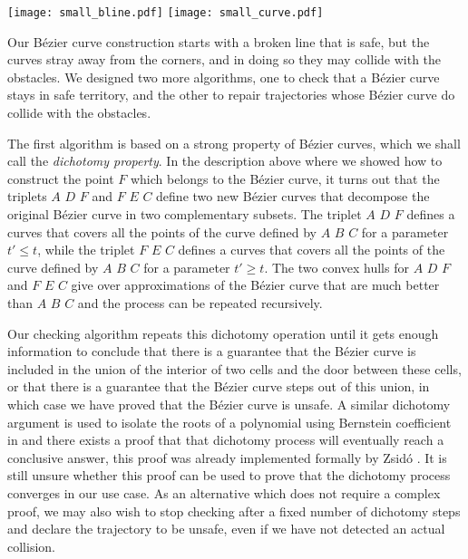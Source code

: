 \documentclass{llncs}
\begin{document}
\begin{center}
\texttt{[image: small\_bline.pdf]}
\texttt{[image: small\_curve.pdf]}
\end{center}

Our Bézier curve construction starts with a broken line that is safe,
but the curves stray away from the corners, and in doing so they may
collide with the obstacles.  We designed two more algorithms, one to check
that a Bézier curve stays in safe territory, and the other to repair
trajectories whose Bézier curve do collide with the obstacles.

The first algorithm is based on a strong property of Bézier curves,
which we shall call the {\em dichotomy property}.  In the description above
where we showed how to construct the point \(F\) which belongs to
the Bézier curve, it turns out that the triplets \(A\) \(D\) \(F\) and
\(F\) \(E\) \(C\) define two new Bézier curves that decompose the
original Bézier curve in two complementary subsets.  The triplet
\(A\) \(D\) \(F\) defines a curves that
covers all the points of the curve defined by \(A\) \(B\) \(C\)
for a parameter \(t' \leq t\), while the triplet \(F\) \(E\) \(C\) 
defines a curves that covers all the points of the curve defined
by \(A\) \(B\) \(C\) for a parameter \(t'\geq t\).  The two convex
hulls for \(A\) \(D\) \(F\) and \(F\) \(E\) \(C\) 
give over approximations of the Bézier curve that are much better than
 \(A\) \(B\) \(C\) and the process can be repeated recursively.

Our checking
algorithm repeats this dichotomy operation until it gets enough
information to conclude that there is a guarantee that the Bézier curve
is included in the union of the interior of two cells and the door
between these cells, or that there is a guarantee that the Bézier curve
steps out of this union, in which case we have proved that the Bézier
curve is unsafe.  A similar dichotomy argument is used to isolate the
roots of a polynomial using Bernstein coefficient in
\cite{basu:hal-01083587} and there exists a proof that that dichotomy
process will eventually reach a conclusive answer, this proof was
already implemented formally by Zsid\'o \cite{Zsido2014}.  It is still
unsure whether this proof can be used to prove that the dichotomy
process converges in our use case.  As an alternative which does not
require a complex proof, we may also wish to stop checking after a
fixed number of dichotomy steps and declare the trajectory to be
unsafe, even if we have not detected an actual collision.
\end{document}
